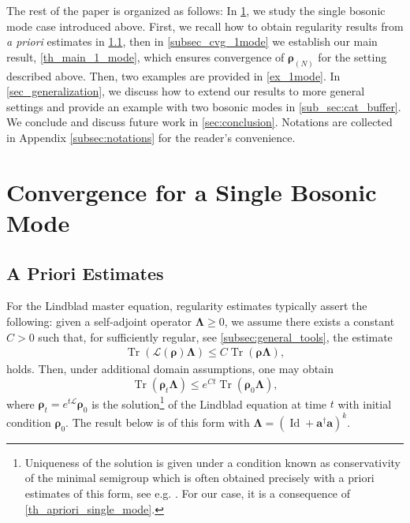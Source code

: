 \documentclass{article}
\newcommand{\xL}{\mathcal{L}}
\newcommand{\xtr}[1]{\operatorname{Tr}\left( #1 \right)}
\newcommand{\rN}{{\boldsymbol{\rho}_{(N)}}}
\let\bf\boldsymbol
\newcommand{\Id}{\operatorname{Id}}
\newcommand{\orho}{{\bf \rho}}
\newcommand{\oa}{{\bf a}}
\newcommand{\oLambda}{{\bf \Lambda}}
\begin{document}
The rest of the paper is organized as follows: In \cref{sec:one_mode}, we study the single bosonic mode case introduced above. First, we recall how to obtain regularity results from \textit{a priori} estimates in \cref{subsec:apriori_one_mode}, then in \cref{subsec_cvg_1mode} we establish our main result, \cref{th_main_1_mode}, which ensures convergence of $\rN$ for the setting described above. Then, two examples are provided in \cref{ex_1mode}. In \cref{sec_generalization}, we discuss how to extend our results to more general settings and provide an example with two bosonic modes in \cref{sub_sec:cat_buffer}. We conclude and discuss future work in \cref{sec:conclusion}. Notations are collected in Appendix \ref{subsec:notations} for the reader's convenience.
\section{Convergence for a Single Bosonic Mode}
\label{sec:one_mode}

\subsection{A Priori Estimates}
\label{subsec:apriori_one_mode}

For the Lindblad master equation, regularity estimates typically assert the following: given a self-adjoint operator $\oLambda \geq 0$, we assume there exists a constant $C > 0$ such that, for sufficiently regular, see \cref{subsec:general_tools}, the estimate
\begin{align}
    \xtr{\xL(\orho )\oLambda}\leq C \xtr{\orho  \oLambda},
\end{align}
holds. Then, under additional domain assumptions, one may obtain
\[
\xtr{\orho _t \oLambda}\leq e^{Ct} \xtr{\orho_0 \oLambda},
\]
where $\orho_t = e^{t\xL}\orho_0$ is the solution\footnote{Uniqueness of the solution is given under a condition known as conservativity of the minimal semigroup which is often obtained precisely with a priori estimates of this form, see e.g. \cite{chebotarevSufficientConditionsConservativity1993,chebotarevSufficientConditionsConservativity1998}. For our case, it is a consequence of \cref{th_apriori_single_mode}.} of the Lindblad equation at time $t$ with initial condition $\orho_0$. 
The result below is of this form with $\oLambda = (\Id + \oa^\dag \oa)^k$.
\end{document}
